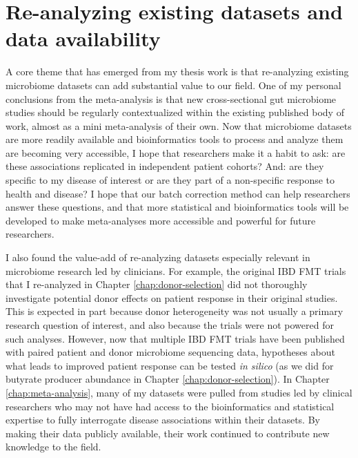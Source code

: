 \section{Re-analyzing existing datasets and data availability}

A core theme that has emerged from my thesis work is that re-analyzing existing microbiome datasets can add substantial value to our field.
One of my personal conclusions from the meta-analysis is that new cross-sectional gut microbiome studies should be regularly contextualized within the existing published body of work, almost as a mini meta-analysis of their own.
Now that microbiome datasets are more readily available and bioinformatics tools to process and analyze them are becoming very accessible, I hope that researchers make it a habit to ask: are these associations replicated in independent patient cohorts? And: are they specific to my disease of interest or are they part of a non-specific response to health and disease?
I hope that our batch correction method can help researchers answer these questions, and that more statistical and bioinformatics tools will be developed to make meta-analyses more accessible and powerful for future researchers.

I also found the value-add of re-analyzing datasets especially relevant in microbiome research led by clinicians.
For example, the original IBD FMT trials that I re-analyzed in Chapter \ref{chap:donor-selection} did not thoroughly investigate potential donor effects on patient response in their original studies.
This is expected in part because donor heterogeneity was not usually a primary research question of interest, and also because the trials were not powered for such analyses.
However, now that multiple IBD FMT trials have been published with paired patient and donor microbiome sequencing data, hypotheses about what leads to improved patient response can be tested \textit{in silico} (as we did for butyrate producer abundance in Chapter \ref{chap:donor-selection}).
In Chapter \ref{chap:meta-analysis}, many of my datasets were pulled from studies led by clinical researchers who may not have had access to the bioinformatics and statistical expertise to fully interrogate disease associations within their datasets.
By making their data publicly available, their work continued to contribute new knowledge to the field.

